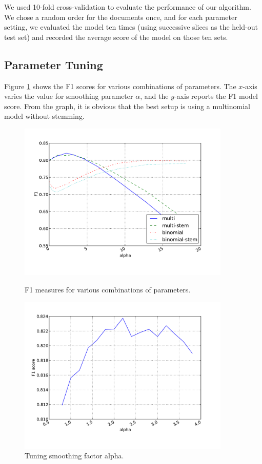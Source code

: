 \documentclass{article}
\begin{document}
We used 10-fold cross-validation to evaluate the performance of our algorithm.  We chose a random order for the documents once, and for each parameter setting, we evaluated the model ten times (using successive slices as the held-out test set) and recorded the average score of the model on those ten sets.


\subsection{Parameter Tuning}
\label{sec:alpha}

Figure \ref{all-combo} shows the F1 scores for various combinations of parameters. The \(x\)-axis varies the value for smoothing parameter \(\alpha\), and the \(y\)-axis reports the F1 model score. From the graph, it is obvious that the best setup is using a multinomial model without stemming.

\begin{figure}
  \centering
  \caption{F1 measures for various combinations of parameters.}
  \includegraphics[width=0.9\textwidth]{graphs/all-combo.pdf}
  \label{all-combo}
\end{figure}

\begin{figure}
  \centering
  \caption{Tuning smoothing factor alpha.}
  \includegraphics[width=0.9\textwidth]{graphs/alpha.pdf}
\end{figure}
\end{document}
